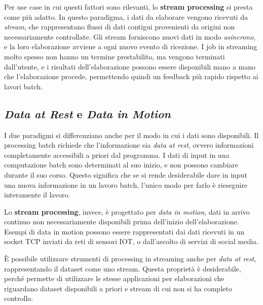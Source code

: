 \documentclass[italian,a4paper, twoside, 12pt]{report}
\begin{document}
Per use case in cui questi fattori sono rilevanti, lo \textbf{stream
processing} si presta come più adatto. In questo paradigma, i dati da
elaborare vengono ricevuti da \emph{stream}, che rappresentano flussi di
dati contigui provenienti da origini non necessariamente controllate.
Gli stream forniscono nuovi dati in modo \emph{asincrono}, e la loro
elaborazione avviene a ogni nuovo evento di ricezione. I job in
streaming molto spesso non hanno un termine prestabilito, ma vengono
terminati dall'utente, e i risultati dell'elaborazione possono essere
disponibili mano a mano che l'elaborazione procede, permettendo quindi
un feedback più rapido rispetto ai lavori batch.

\subsection{\texorpdfstring{\emph{Data at Rest} e \emph{Data in
Motion}}{Data at Rest e Data in Motion}}\label{data-at-rest-e-data-in-motion}

I due paradigmi si differenziano anche per il modo in cui i dati sono
disponibili. Il processing batch richiede che l'informazione sia
\emph{data at rest}, ovvero informazioni completamente accessibili a
priori dal programma. I dati di input in una computazione batch sono
determinati al suo inizio, e non possono cambiare durante il suo corso.
Questo significa che se si rende desiderabile dare in input una nuova
informazione in un lavoro batch, l'unico modo per farlo è rieseguire
interamente il lavoro.

Lo \textbf{stream processing}, invece, è progettato per \emph{data in
motion}, dati in arrivo continuo non necessariamente disponibili prima
dell'inizio dell'elaborazione. Esempi di data in motion possono essere
rappresentati dai dati ricevuti in un socket TCP inviati da reti di
sensori IOT, o dall'ascolto di servizi di social media.

È possibile utilizzare strumenti di processing in streaming anche per
\emph{data at rest}, rappresentando il dataset come uno stream. Questa
proprietà è desiderabile, perché permette di utilizzare le stesse
applicazioni per elaborazioni che riguardano dataset disponibili a
priori e stream di cui non si ha completo controllo.
\end{document}
